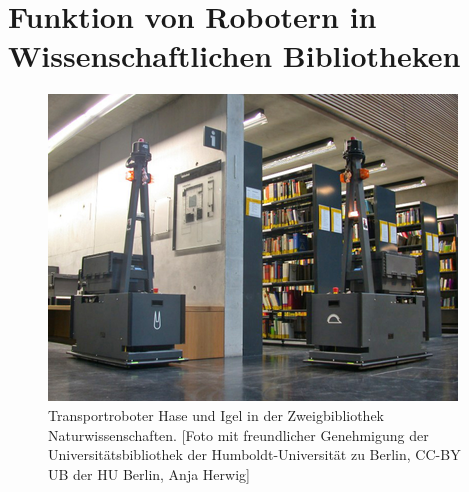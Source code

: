 \documentclass[a4paper,
fontsize=11pt,
oneside,
numbers=noperiodatend,
parskip=half-,
bibliography=totoc,
final
]{scrartcl}
\begin{document}
\hypertarget{funktion-von-robotern-in-wissenschaftlichen-bibliotheken}{%
\section{Funktion von Robotern in Wissenschaftlichen
Bibliotheken}\label{funktion-von-robotern-in-wissenschaftlichen-bibliotheken}}

\begin{figure}
\centering
\includegraphics[width=.7\textwidth]{img/HaseIgel.png}
\caption{Transportroboter Hase und Igel in der Zweigbibliothek
Naturwissenschaften. {[}Foto mit freundlicher Genehmigung der
Universitätsbibliothek der Humboldt-Universität zu Berlin, CC-BY UB der
HU Berlin, Anja Herwig{]}}
\end{figure}
\end{document}
